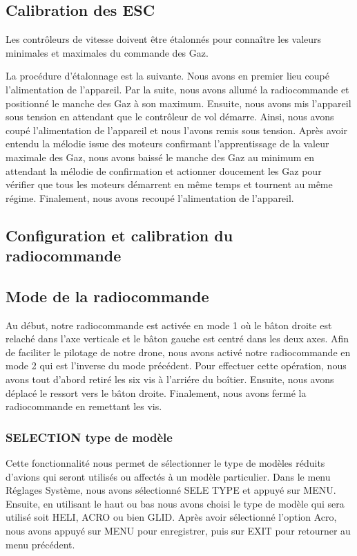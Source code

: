 \documentclass[a4paper,12pt]{book}
\begin{document}
\subsection{Calibration des ESC}
Les contrôleurs de vitesse doivent être étalonnés pour connaître les valeurs minimales et maximales du commande des Gaz. 


La procédure d’étalonnage est la suivante. Nous avons en premier lieu coupé l’alimentation de l’appareil. Par la suite, nous avons allumé la radiocommande et positionné le manche des Gaz à son maximum. Ensuite, nous avons mis l’appareil sous tension en attendant que le contrôleur de vol démarre. Ainsi, nous avons coupé l’alimentation de l’appareil et nous l'avons remis sous tension. Après avoir entendu la mélodie issue des moteurs confirmant l’apprentissage de la valeur maximale des Gaz, nous avons baissé le manche des Gaz au minimum en attendant la mélodie de confirmation et actionner doucement les Gaz pour vérifier que tous les moteurs démarrent en même temps et tournent au même régime. Finalement, nous avons recoupé l’alimentation de l’appareil.
\subsection{Configuration et calibration du radiocommande}
\subsection{Mode de la radiocommande}

Au début, notre radiocommande est activée en mode 1 où le bâton droite est relaché dans l'axe verticale et le bâton gauche est centré dans les deux axes. Afin de faciliter le pilotage de notre drone, nous avons activé notre radiocommande en mode 2  qui est l'inverse du mode précédent. Pour effectuer cette opération, nous avons tout d'abord retiré les six vis à l'arriére du boîtier. Ensuite, nous avons déplacé le ressort vers le bâton droite.  Finalement, nous avons fermé la radiocommande en remettant les vis.


\subsubsection{SELECTION type de modèle}
Cette fonctionnalité nous permet de sélectionner le type de modèles réduits d'avions qui seront utilisés ou affectés à un modèle particulier.
Dans le menu Réglages Système, nous avons sélectionné SELE TYPE et appuyé sur MENU. Ensuite, en utilisant le haut ou bas nous avons choisi le type de modèle qui sera utilisé soit HELI, ACRO ou bien GLID. Après avoir sélectionné l'option Acro, nous avons appuyé sur MENU pour enregistrer, puis sur EXIT pour retourner au menu précédent.
\end{document}
